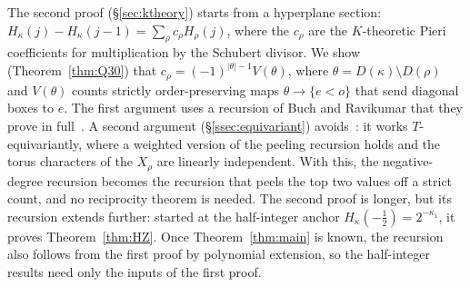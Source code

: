 \documentclass[11pt]{amsart}
\theoremstyle{definition}
\theoremstyle{remark}
\begin{document}
The second proof (\S\ref{sec:ktheory}) starts from a hyperplane section:
$H_\kappa(j)-H_\kappa(j-1)=\sum_\rho c_\rho H_\rho(j)$, where the $c_\rho$ are the
$K$-theoretic Pieri coefficients for multiplication by the Schubert divisor. We show
(Theorem~\ref{thm:Q30}) that $c_\rho=(-1)^{|\theta|-1}V(\theta)$, where
$\theta=D(\kappa)\setminus D(\rho)$ and $V(\theta)$ counts strictly order-preserving maps
$\theta\to\{e<o\}$ that send diagonal boxes to $e$. The first argument uses a recursion of Buch and
Ravikumar that they prove in full~\cite[Thm.~5.5]{BR12}. A second argument
(\S\ref{ssec:equivariant}) avoids~\cite{BR12}: it works $T$-equivariantly, where a weighted version
of the peeling recursion holds and the torus characters of the $X_\rho$ are linearly independent. With this, the negative-degree
recursion becomes the recursion that peels the top two values off a strict count, and no
reciprocity theorem is needed. The second proof is longer, but its recursion extends further:
started at the half-integer anchor $H_\kappa(-\tfrac12)=2^{-\kappa_1}$, it proves
Theorem~\ref{thm:HZ}. Once Theorem~\ref{thm:main} is known, the recursion also follows from the
first proof by polynomial extension, so the half-integer results need only the inputs of the
first proof.
\end{document}
